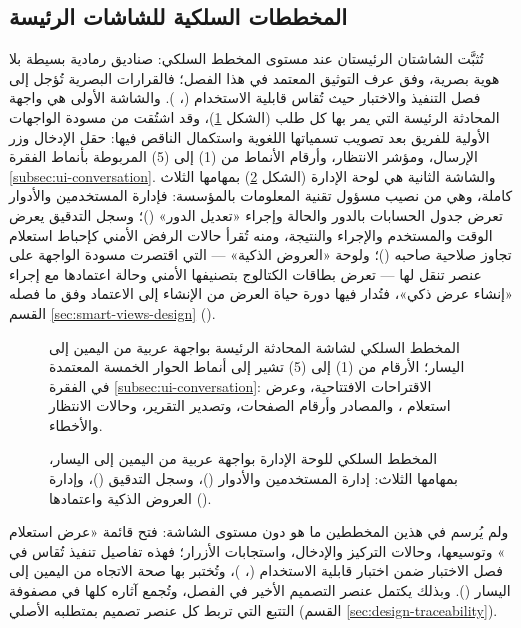 \subsection{المخططات السلكية للشاشات الرئيسة}
\label{subsec:ui-wireframes}

تُثبَّت الشاشتان الرئيستان عند مستوى المخطط السلكي: صناديق رمادية بسيطة بلا هوية بصرية، وفق عرف التوثيق المعتمد في هذا الفصل؛ فالقرارات البصرية تُؤجل إلى فصل التنفيذ والاختبار حيث تُقاس قابلية الاستخدام (، ). والشاشة الأولى هي واجهة المحادثة الرئيسة التي يمر بها كل طلب (الشكل \ref{fig:wireframes-chat})، وقد اشتُقت من مسودة الواجهات الأولية للفريق بعد تصويب تسمياتها اللغوية واستكمال الناقص فيها: حقل الإدخال وزر الإرسال، ومؤشر الانتظار، وأرقام الأنماط من (1) إلى (5) المربوطة بأنماط الفقرة \ref{subsec:ui-conversation}. والشاشة الثانية هي لوحة الإدارة (الشكل \ref{fig:wireframes-admin}) بمهامها الثلاث كاملة، وهي من نصيب مسؤول تقنية المعلومات بالمؤسسة: فإدارة المستخدمين والأدوار تعرض جدول الحسابات بالدور والحالة وإجراء «تعديل الدور» ()؛ وسجل التدقيق يعرض الوقت والمستخدم والإجراء والنتيجة، ومنه تُقرأ حالات الرفض الأمني كإحباط استعلام تجاوز صلاحية صاحبه ()؛ ولوحة «العروض الذكية» — التي اقتصرت مسودة الواجهة على عنصر تنقل لها — تعرض بطاقات الكتالوج بتصنيفها الأمني وحالة اعتمادها مع إجراء «إنشاء عرض ذكي»، فتُدار فيها دورة حياة العرض من الإنشاء إلى الاعتماد وفق ما فصله القسم \ref{sec:smart-views-design} ().

\begin{figure}[H]
  \centering
  
  \caption{المخطط السلكي لشاشة المحادثة الرئيسة بواجهة عربية من اليمين إلى اليسار؛ الأرقام من (1) إلى (5) تشير إلى أنماط الحوار الخمسة المعتمدة في الفقرة \ref{subsec:ui-conversation}: الاقتراحات الافتتاحية، وعرض استعلام ، والمصادر وأرقام الصفحات، وتصدير التقرير، وحالات الانتظار والأخطاء.}
  \label{fig:wireframes-chat}
\end{figure}

\begin{figure}[H]
  \centering
  
  \caption{المخطط السلكي للوحة الإدارة بواجهة عربية من اليمين إلى اليسار، بمهامها الثلاث: إدارة المستخدمين والأدوار ()، وسجل التدقيق ()، وإدارة العروض الذكية واعتمادها ().}
  \label{fig:wireframes-admin}
\end{figure}

ولم يُرسم في هذين المخططين ما هو دون مستوى الشاشة: فتح قائمة «عرض استعلام » وتوسيعها، وحالات التركيز والإدخال، واستجابات الأزرار؛ فهذه تفاصيل تنفيذ تُقاس في فصل الاختبار ضمن اختبار قابلية الاستخدام (، )، وتُختبر بها صحة الاتجاه من اليمين إلى اليسار (). وبذلك يكتمل عنصر التصميم الأخير في الفصل، وتُجمع آثاره كلها في مصفوفة التتبع التي تربط كل عنصر تصميم بمتطلبه الأصلي (القسم \ref{sec:design-traceability}).
